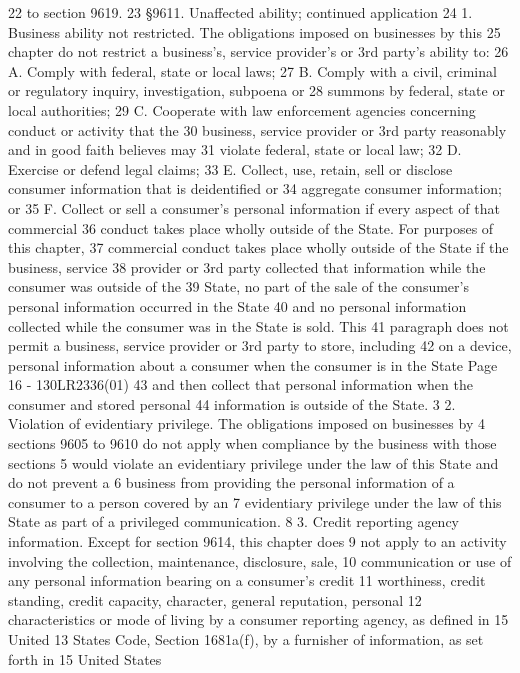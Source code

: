 22 to section 9619.
23 §9611. Unaffected ability; continued application
24 1. Business ability not restricted. The obligations imposed on businesses by this
25 chapter do not restrict a business's, service provider's or 3rd party's ability to:
26 A. Comply with federal, state or local laws;
27 B. Comply with a civil, criminal or regulatory inquiry, investigation, subpoena or
28 summons by federal, state or local authorities;
29 C. Cooperate with law enforcement agencies concerning conduct or activity that the
30 business, service provider or 3rd party reasonably and in good faith believes may
31 violate federal, state or local law;
32 D. Exercise or defend legal claims;
33 E. Collect, use, retain, sell or disclose consumer information that is deidentified or
34 aggregate consumer information; or
35 F. Collect or sell a consumer's personal information if every aspect of that commercial
36 conduct takes place wholly outside of the State. For purposes of this chapter,
37 commercial conduct takes place wholly outside of the State if the business, service
38 provider or 3rd party collected that information while the consumer was outside of the
39 State, no part of the sale of the consumer's personal information occurred in the State
40 and no personal information collected while the consumer was in the State is sold. This
41 paragraph does not permit a business, service provider or 3rd party to store, including
42 on a device, personal information about a consumer when the consumer is in the State 
Page 16 - 130LR2336(01)
43 and then collect that personal information when the consumer and stored personal
44 information is outside of the State.
3 2. Violation of evidentiary privilege. The obligations imposed on businesses by
4 sections 9605 to 9610 do not apply when compliance by the business with those sections
5 would violate an evidentiary privilege under the law of this State and do not prevent a
6 business from providing the personal information of a consumer to a person covered by an
7 evidentiary privilege under the law of this State as part of a privileged communication.
8 3. Credit reporting agency information. Except for section 9614, this chapter does
9 not apply to an activity involving the collection, maintenance, disclosure, sale,
10 communication or use of any personal information bearing on a consumer's credit
11 worthiness, credit standing, credit capacity, character, general reputation, personal
12 characteristics or mode of living by a consumer reporting agency, as defined in 15 United
13 States Code, Section 1681a(f), by a furnisher of information, as set forth in 15 United States
